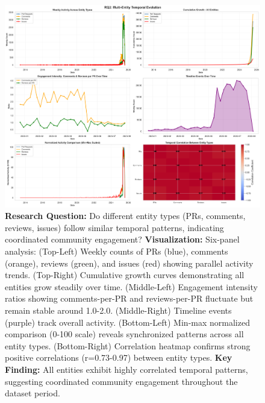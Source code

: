 \documentclass[11pt]{article}
\begin{document}
\begin{figure}[H]
\centering
\includegraphics[width=\textwidth]{figures/temporal_02_multi_entity_evolution.png}
\caption{\textbf{Research Question:} Do different entity types (PRs, comments, reviews, issues) follow similar temporal patterns, indicating coordinated community engagement? \textbf{Visualization:} Six-panel analysis: (Top-Left) Weekly counts of PRs (blue), comments (orange), reviews (green), and issues (red) showing parallel activity trends. (Top-Right) Cumulative growth curves demonstrating all entities grow steadily over time. (Middle-Left) Engagement intensity ratios showing comments-per-PR and reviews-per-PR fluctuate but remain stable around 1.0-2.0. (Middle-Right) Timeline events (purple) track overall activity. (Bottom-Left) Min-max normalized comparison (0-100 scale) reveals synchronized patterns across all entity types. (Bottom-Right) Correlation heatmap confirms strong positive correlations (r=0.73-0.97) between entity types. \textbf{Key Finding:} All entities exhibit highly correlated temporal patterns, suggesting coordinated community engagement throughout the dataset period.}
\label{fig:temporal_multi}
\end{figure}
\end{document}
